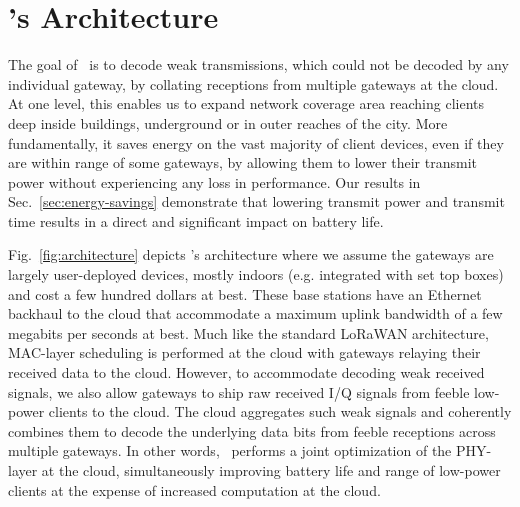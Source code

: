 \section{\name's Architecture}
\label{sec:arch}



The goal of \name\ is to decode weak transmissions, which could not be
decoded by any individual gateway, by collating receptions from multiple
gateways at the cloud. At one level, this  enables us to expand network coverage area reaching clients deep inside buildings, underground or in outer reaches of the city. More fundamentally, it saves energy on the vast majority of client devices, even if they are within range of some gateways, by allowing them to lower their transmit power without experiencing any loss in performance. Our results in Sec.~\ref{sec:energy-savings} demonstrate that lowering transmit power and transmit time results in a direct and significant impact on battery life. 

Fig.~\ref{fig:architecture} depicts \name's architecture where we assume the gateways are largely user-deployed devices, mostly indoors (e.g. integrated with set top boxes) and cost a few hundred dollars at best. These base stations have an Ethernet backhaul to the cloud that accommodate a maximum uplink bandwidth of a few megabits per seconds at best. Much like the standard LoRaWAN architecture, MAC-layer scheduling is performed at the cloud with gateways relaying their received data to the cloud. However, to accommodate decoding weak received signals, we also allow gateways to ship raw received I/Q signals from feeble low-power clients to the cloud. The cloud aggregates such weak signals and coherently combines them to decode the underlying data bits from feeble receptions across multiple gateways. In other words, \name\ performs a joint optimization of the  PHY-layer at the cloud, simultaneously improving battery life and range of low-power clients at the expense of increased computation at the cloud. 

